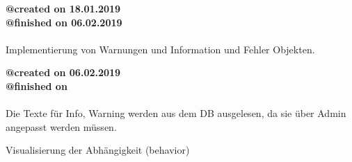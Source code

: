 \documentclass{article}
\begin{document}
\noindent \textbf{@created on 18.01.2019}\\
\textbf{@finished on 06.02.2019}\\\\

Implementierung von Warnungen und Information und Fehler Objekten.

\noindent \textbf{@created on 06.02.2019}\\
\textbf{@finished on}\\\\
Die Texte für Info, Warning werden aus dem DB ausgelesen, da sie über Admin angepasst werden müssen.

Visualisierung der Abhängigkeit (behavior)
\end{document}
